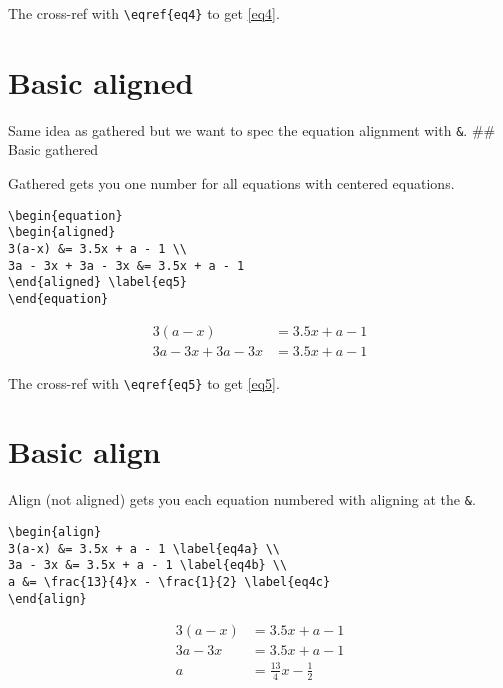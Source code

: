 \documentclass[
  letterpaper,
  DIV=11,
  numbers=noendperiod]{scrreprt}
\begin{document}
The cross-ref with \texttt{\textbackslash{}eqref\{eq4\}} to get
\eqref{eq4}.

\section{Basic aligned}\label{basic-aligned}

Same idea as gathered but we want to spec the equation alignment with
\texttt{\&}. \#\# Basic gathered

Gathered gets you one number for all equations with centered equations.

\begin{verbatim}
\begin{equation}  
\begin{aligned}
3(a-x) &= 3.5x + a - 1 \\
3a - 3x + 3a - 3x &= 3.5x + a - 1 
\end{aligned} \label{eq5}
\end{equation}
\end{verbatim}

\begin{equation}  
\begin{aligned}
3(a-x) &= 3.5x + a - 1 \\
3a - 3x + 3a - 3x &= 3.5x + a - 1 
\end{aligned} \label{eq5}
\end{equation}

The cross-ref with \texttt{\textbackslash{}eqref\{eq5\}} to get
\eqref{eq5}.

\section{Basic align}\label{basic-align}

Align (not aligned) gets you each equation numbered with aligning at the
\texttt{\&}.

\begin{verbatim}
\begin{align}  
3(a-x) &= 3.5x + a - 1 \label{eq4a} \\
3a - 3x &= 3.5x + a - 1 \label{eq4b} \\
a &= \frac{13}{4}x - \frac{1}{2} \label{eq4c}
\end{align}
\end{verbatim}

\begin{align}  
3(a-x) &= 3.5x + a - 1 \label{eq4a} \\
3a - 3x &= 3.5x + a - 1 \label{eq4b} \\
a &= \frac{13}{4}x - \frac{1}{2} \label{eq4c}
\end{align}
\end{document}
